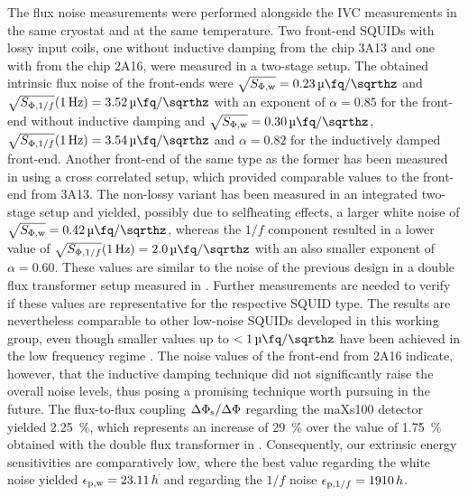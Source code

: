 The flux noise measurements were performed alongside the IVC measurements in the same cryostat and at the same temperature. Two front-end SQUIDs with lossy input coils, one without inductive damping from the chip 3A13 and one with from the chip 2A16, were measured in a two-stage setup. The obtained intrinsic flux noise of the front-ends were  $\sqrt{S_{\rm \Phi,w}}=\qty{0.23}{\micro\fq\per\sqrthz}$ and $\sqrt{S_{{\rm \Phi},1/f}}(\qty{1}{\Hz})=\qty{3.52}{\micro\fq\per\sqrthz}$ with an exponent of $\alpha=0.85$ for the front-end without inductive damping and $\sqrt{S_{\rm \Phi,w}}=\qty{0.30}{\micro\fq\per\sqrthz}$, $\sqrt{S_{{\rm \Phi},1/f}}(\qty{1}{\Hz})=\qty{3.54}{\micro\fq\per\sqrthz}$ and $\alpha=0.82$ for the inductively damped front-end. Another front-end of the same type as the former has been measured in \cite{Mazibrada2024} using a cross correlated setup, which provided comparable values to the front-end from 3A13. The non-lossy variant has been measured in an integrated two-stage setup and yielded, possibly due to selfheating effects, a larger white noise of $\sqrt{S_{\rm \Phi,w}}=\qty{0.42}{\micro\fq\per\sqrthz}$, whereas the $1/f$ component resulted in a lower value of $\sqrt{S_{{\rm \Phi},1/f}}(\qty{1}{\Hz})=\qty{2.0}{\micro\fq\per\sqrthz}$ with an also smaller exponent of $\alpha=0.60$. These values are similar to the noise of the previous design in a double flux transformer setup measured in \cite{Bauer2022}. Further measurements are needed to verify if these values are representative for the respective SQUID type. The results are nevertheless comparable to other low-noise SQUIDs developed in this working group, even though smaller values up to $<\qty{1}{\micro\fq\per\sqrthz}$ have been achieved in the low frequency regime \cite{Ferring2015}. The noise values of the front-end from 2A16 indicate, however, that the inductive damping technique did not significantly raise the overall noise levels, thus posing a promising technique worth pursuing in the future. The flux-to-flux coupling $\Delta\Phi_{\rm s}/\Delta\Phi$ regarding the maXs100 detector yielded \qty{2.25}{\percent}, which represents an increase of \qty{29}{\percent} over the value of \qty{1.75}{\percent} obtained with the double flux transformer in \cite{Bauer2022}. Consequently, our extrinsic energy sensitivities are comparatively low, where the best value regarding the white noise yielded $\epsilon_{\rm p,w}=23.11\, h$ and regarding the $1/f$ noise $\epsilon_{{\rm p}, 1/f}=1910\, h$. \\

